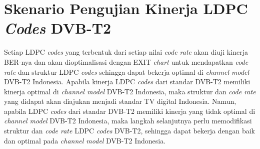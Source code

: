 \section{Skenario Pengujian Kinerja LDPC \textit{Codes} DVB-T2}
Setiap LDPC \textit{codes} yang terbentuk dari setiap nilai \textit{code rate} akan diuji kinerja BER-nya dan akan dioptimalisasi dengan EXIT \textit{chart} untuk mendapatkan \textit{code rate} dan struktur  LDPC \textit{codes} sehingga dapat bekerja optimal di \textit{channel model} DVB-T2 Indonesia. Apabila kinerja LDPC \textit{codes} dari standar DVB-T2 memiliki kinerja optimal di \textit{channel model} DVB-T2 Indonesia, maka struktur dan \textit{code rate} yang didapat akan diajukan menjadi standar TV digital Indonesia. Namun, apabila LDPC \textit{codes} dari standar DVB-T2 memiliki kinerja yang tidak optimal di \textit{channel model} DVB-T2 Indonesia, maka langkah selanjutnya perlu memodifikasi struktur dan \textit{code rate} LDPC \textit{codes} DVB-T2, sehingga dapat bekerja dengan baik dan optimal pada \textit{channel model} DVB-T2 Indonesia. 
